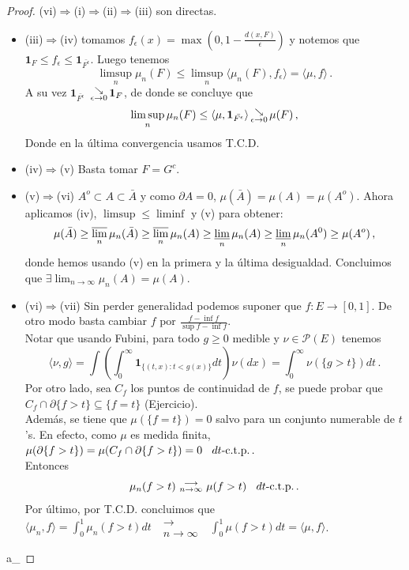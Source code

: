 \documentclass[letterpaper,11pt]{article} %
\def\espacio{\hspace{.25cm}\,}
\theoremstyle{defbreak}
\theoremstyle{propbreak}
\theoremstyle{remark}
\theoremstyle{break}
\def\conv{\mbox{ }\substack{\longrightarrow \\ n\to\infty}\mbox{ }}
\def\ejercicio{\color{blue}Ejercicio\color{black}}
\def\gris{\color{mygray}}
\def\negro{\color{black}}
\def\findem{\null\hfill\color{white}a\color{black}_\square}
\begin{document}
\begin{proof}
\gris
(vi)$\Rightarrow$(i)$\Rightarrow$(ii)$\Rightarrow$(iii) son directas.

\begin{itemize}
    \item[] (iii)$\Rightarrow$(iv) tomamos $f_\epsilon(x)=\max(0,1-\frac{d(x,F)}{\epsilon})$ y notemos que $\mathbf{1}_F\leq f_\epsilon\leq\mathbf{1}_\bar{{F^\epsilon}}$. Luego tenemos
    $$\displaystyle\limsup_{n}\mu_n(F)\leq\limsup_{n}\langle\mu_n(F),f_\epsilon\rangle=\langle\mu,f\rangle \, .$$
    A su vez $\mathbf{1}_\bar{{F^\epsilon}}$ $\,\substack{\searrow \\ \tiny{\epsilon\to 0}}\,\mathbf{1}_F$, de donde se concluye que
    $$ \displaystyle\limsup_n\mu_n(F)\leq \langle \mu,\mathbf{1}_{\bar{{F^\epsilon}}} \rangle \,\substack{\searrow \\ \tiny{\epsilon\to 0}}\, \mu(F) \, ,$$
    Donde en la última convergencia usamos T.C.D.
    \item[] (iv)$\Rightarrow$(v) Basta tomar $F=G^c$.
    \item[] (v)$\Rightarrow$(vi) $A^o \subset A\subset \bar{A}$ y como $\partial A=0$, $\mu(\bar{A})=\mu(A)=\mu(A^o)$. Ahora aplicamos (iv), $\limsup\leq\liminf$ y (v) para obtener: $$\mu(\bar{A})\geq \displaystyle \varlimsup_n \mu_n(\bar{A}) \geq \varlimsup_n \mu_n(A) \geq \varliminf_{n}\mu_n(A) \geq \varliminf_{n} \mu_n(A^0) \geq\mu(A^o) \, ,$$ donde hemos usando (v) en la primera y la última desigualdad. Concluimos que $\exists \lim_{n\to\infty}\mu_n(A)=\mu(A)$.
    \item[] (vi)$\Rightarrow$(vii) Sin perder generalidad podemos suponer que $f:E\longrightarrow[0,1]$. De otro modo basta cambiar $f$ por $\frac{f-\inf f}{\sup f - \inf f}$.
    \\ Notar que usando Fubini, para todo $g\geq0$ medible y $\nu\in\mathcal{P}(E)$ tenemos
    $$ \langle \nu,g \rangle = \displaystyle\int(\int^\infty_0 \mathbf{1}_{\{(t,x):t<g(x)\}}dt)\nu(dx)=\int^\infty_0\nu(\{g>t\})dt \, .$$
    Por otro lado, sea $C_f$ los puntos de continuidad de $f$, se puede probar que  $C_f\cap\partial\{f>t\}\subseteq\{f=t\}$ (\ejercicio \gris ).
    \\ Además, se tiene que $\mu(\{f=t\})=0$ salvo para un conjunto numerable de $t$'s. En efecto, como $\mu$ es medida finita, $\mu(\partial\{f>t\})=\mu(C_f\cap \partial\{f>t\})=0 \espacio dt\mbox{-c.t.p.} \, .$
    \\ Entonces $$ \mu_n(f>t) \conv \mu(f>t) \espacio dt\mbox{-c.t.p.} \, .$$
    Por último, por T.C.D. concluimos que $\langle \mu_n,f \rangle = \displaystyle\int^1_0 \mu_n(f>t)dt \conv \int^1_0\mu(f>t)dt = \langle \mu, f\rangle$.
\end{itemize}
\findem \negro
\end{proof}
\end{document}
